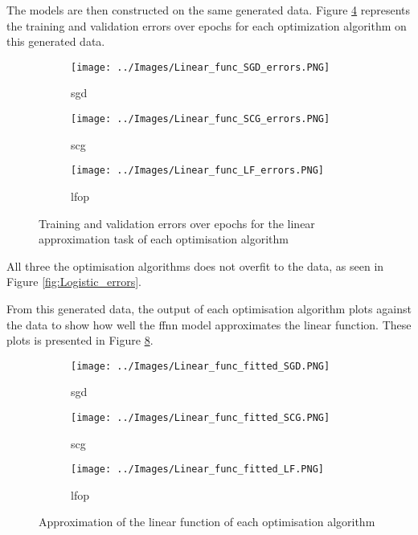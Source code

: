 \documentclass[10pt, conference]{IEEEtran}
\begin{document}
The models are then constructed on the same generated data. Figure \ref{fig:Linear_errors} represents
the training and validation errors over epochs for each optimization algorithm on this generated data.
\begin{figure}[H]
    \centering
    \begin{subfigure}[b]{0.23\textwidth}
        \centering
        \texttt{[image: ../Images/Linear\_func\_SGD\_errors.PNG]}
        \caption{\acrshort{sgd}}
        \label{fig:Linear_func_SGD_errors}
    \end{subfigure}
    \hfill
    \begin{subfigure}[b]{0.23\textwidth}
        \centering
        \texttt{[image: ../Images/Linear\_func\_SCG\_errors.PNG]}
        \caption{\acrshort{scg}}
        \label{fig:Linear_func_SCG_errors}
    \end{subfigure}
    \begin{subfigure}[b]{0.23\textwidth}
        \centering
        \texttt{[image: ../Images/Linear\_func\_LF\_errors.PNG]}
        \caption{\acrshort{lfop}}
        \label{fig:Linear_func_LF_errors}
    \end{subfigure}
    \caption{Training and validation errors over epochs for the linear approximation task of each optimisation algorithm}
    \label{fig:Linear_errors}
\end{figure}
All three the optimisation algorithms does not overfit to the data, as seen in Figure \ref{fig:Logistic_errors}.

From this generated data, the output of each optimisation algorithm plots against
the data to show how well the \acrshort{ffnn} model approximates the linear function.
These plots is presented in Figure \ref{fig:Linear_approximation}.
\begin{figure}[H]
    \centering
    \begin{subfigure}[b]{0.23\textwidth}
        \centering
        \texttt{[image: ../Images/Linear\_func\_fitted\_SGD.PNG]}
        \caption{\acrshort{sgd}}
        \label{fig:Linear_func_SGD_approximation}
    \end{subfigure}
    \hfill
    \begin{subfigure}[b]{0.23\textwidth}
        \centering
        \texttt{[image: ../Images/Linear\_func\_fitted\_SCG.PNG]}
        \caption{\acrshort{scg}}
        \label{fig:Linear_func_SCG_approximation}
    \end{subfigure}
    \begin{subfigure}[b]{0.23\textwidth}
        \centering
        \texttt{[image: ../Images/Linear\_func\_fitted\_LF.PNG]}
        \caption{\acrshort{lfop}}
        \label{fig:Linear_func_LF_approximation}
    \end{subfigure}
    \caption{Approximation of the linear function of each optimisation algorithm}
    \label{fig:Linear_approximation}
\end{figure}
\end{document}
